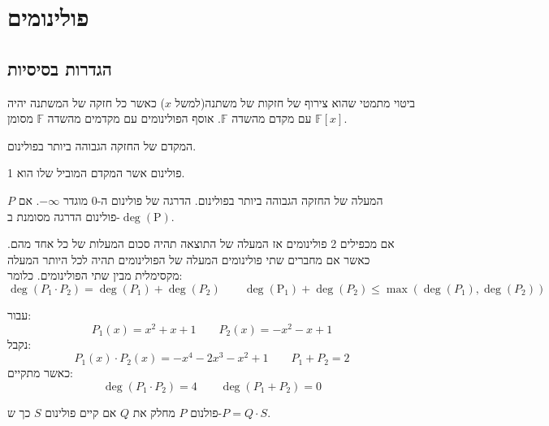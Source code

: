 \documentclass{tstextbook}
\begin{document}
\chapter{פולינומים}

\section{הגדרות בסיסיות}

\begin{definition}[פולינום]
ביטוי מתמטי שהוא צירוף של חזקות של משתנה(למשל \(x\)) כאשר כל חזקה של המשתנה יהיה עם מקדם מהשדה \(\mathbb{F}\). אוסף הפולינומים עם מקדמים מהשדה \(\mathbb{F}\) מסומן \(\mathbb{F} [x]\).

\end{definition}
\begin{definition}
המקדם של החזקה הגבוהה ביותר בפולינום.

\end{definition}
\begin{definition}
פולינום אשר המקדם המוביל שלו הוא 1. 

\end{definition}
\begin{definition}
המעלה של החזקה הגבוהה ביותר בפולינום. הדרגה של פולינום ה-0 מוגדר \(-\infty\). אם \(P\) פולינום הדרגה מסומנת ב-\(\mathrm{\deg(P)}\).

\end{definition}
\begin{proposition}
אם מכפילים 2 פולינומים אז המעלה של התוצאה תהיה סכום המעלות של כל אחד מהם. כאשר אם מחברים שתי פולינומים המעלה של הפולינומים תהיה לכל היותר המעלה מקסימלית מבין שתי הפולינומים. כלומר:
$$\deg\left( P_{1}\cdot P_{2} \right)=\deg(P_{1}) +\deg(P_{2}) \qquad \mathrm{\deg(P_{1}) }+\deg(P_{2}) \leq \max \left( \deg(P_{1}) ,\deg(P_{2})  \right)  $$

\end{proposition}
\begin{example}
עבור:
$$P_{1}(x)=x^{2}+x+1\qquad P_{2}(x)=-x^2-x+1$$
נקבל:
$$P_{1}(x)\cdot P_{2}(x)=- x^{4} - 2 x^{3} - x^{2} + 1 \qquad P_{1}+P_{2}=2$$
כאשר מתקיים:
$${\deg\left( P_{1}\cdot P_{2} \right) }=4\qquad \deg(P_{1}+P_{2})=0 $$

\end{example}
\begin{definition}[חלוקה]
פולנום \(P\) מחלק את \(Q\) אם קיים פולינום \(S\) כך ש-\(P=Q\cdot S\). 

\end{definition}
\end{document}
